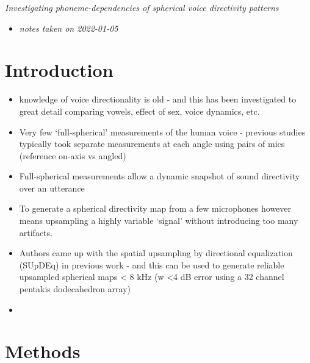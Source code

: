 \documentclass[
]{book}
\providecommand{\tightlist}{%
  \setlength{\itemsep}{0pt}\setlength{\parskip}{0pt}}
\begin{document}

\emph{Investigating phoneme-dependencies of spherical voice directivity patterns} \citep{porschmann2021investigating}

\begin{itemize}
\tightlist
\item
  \emph{notes taken on 2022-01-05}
\end{itemize}

\hypertarget{introduction-16}{%
\section{Introduction}\label{introduction-16}}

\begin{itemize}
\tightlist
\item
  knowledge of voice directionality is old - and this has been investigated to great detail comparing vowels, effect of sex, voice dynamics, etc.
\item
  Very few `full-spherical' measurements of the human voice - previous studies typically took separate measurements at each angle using pairs of mics (reference on-axis vs angled)
\item
  Full-spherical measurements allow a dynamic snapshot of sound directivity over an utterance
\item
  To generate a spherical directivity map from a few microphones however means upsampling a highly variable `signal' without introducing too many artifacts.
\item
  Authors came up with the spatial upsampling by directional equalization (SUpDEq) in previous work - and this can be used to generate reliable upsampled spherical maps \textless{} 8 kHz (w \textless4 dB error using a 32 channel pentakis dodecahedron array)
\item
\end{itemize}

\hypertarget{methods-15}{%
\section{Methods}\label{methods-15}}
\end{document}
